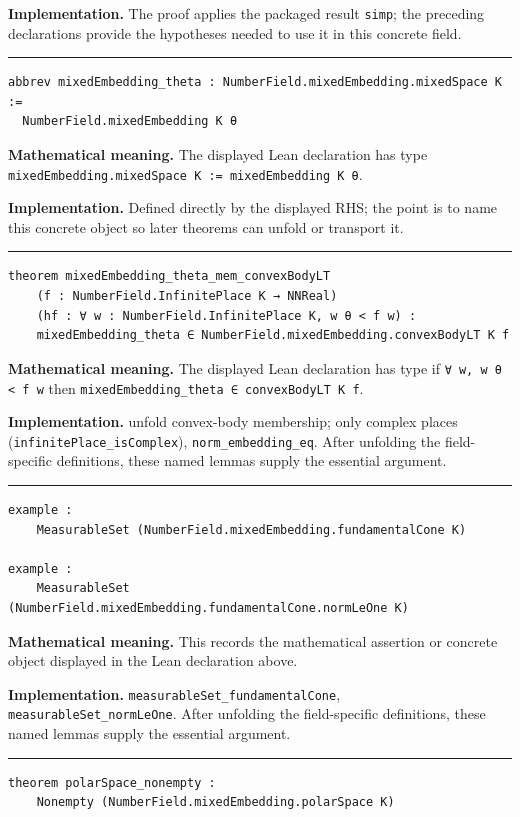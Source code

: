 \documentclass[UTF8,a4paper,11pt,fontset=fandol]{ctexart}
\theoremstyle{definition}
\newcommand{\statementsep}{\par\medskip\hrule\medskip}
\begin{document}
\noindent\textbf{Implementation.} The proof applies the packaged result \texttt{simp}; the preceding declarations provide the hypotheses needed to use it in this concrete field.\par
\statementsep
\begin{verbatim}
abbrev mixedEmbedding_theta : NumberField.mixedEmbedding.mixedSpace K :=
  NumberField.mixedEmbedding K θ
\end{verbatim}
\noindent\textbf{Mathematical meaning.} The displayed Lean declaration has type \texttt{mixedEmbedding.\allowbreak{}mixedSpace K := mixedEmbedding K θ}.\par
\noindent\textbf{Implementation.} Defined directly by the displayed RHS; the point is to name this concrete object so later theorems can unfold or transport it.\par
\statementsep
\begin{verbatim}
theorem mixedEmbedding_theta_mem_convexBodyLT
    (f : NumberField.InfinitePlace K → NNReal)
    (hf : ∀ w : NumberField.InfinitePlace K, w θ < f w) :
    mixedEmbedding_theta ∈ NumberField.mixedEmbedding.convexBodyLT K f
\end{verbatim}
\noindent\textbf{Mathematical meaning.} The displayed Lean declaration has type if \texttt{∀ w, w θ < f w} then \texttt{mixedEmbedding\_\allowbreak{}theta ∈ convexBodyLT K f}.\par
\noindent\textbf{Implementation.} unfold convex-body membership; only complex places (\texttt{infinitePlace\_\allowbreak{}isComplex}), \texttt{norm\_\allowbreak{}embedding\_\allowbreak{}eq}. After unfolding the field-specific definitions, these named lemmas supply the essential argument.\par
\statementsep
\begin{verbatim}
example :
    MeasurableSet (NumberField.mixedEmbedding.fundamentalCone K)

example :
    MeasurableSet (NumberField.mixedEmbedding.fundamentalCone.normLeOne K)
\end{verbatim}
\noindent\textbf{Mathematical meaning.} This records the mathematical assertion or concrete object displayed in the Lean declaration above.\par
\noindent\textbf{Implementation.} \texttt{measurableSet\_\allowbreak{}fundamentalCone}, \texttt{measurableSet\_\allowbreak{}normLeOne}. After unfolding the field-specific definitions, these named lemmas supply the essential argument.\par
\statementsep
\begin{verbatim}
theorem polarSpace_nonempty :
    Nonempty (NumberField.mixedEmbedding.polarSpace K)
\end{verbatim}
\end{document}
